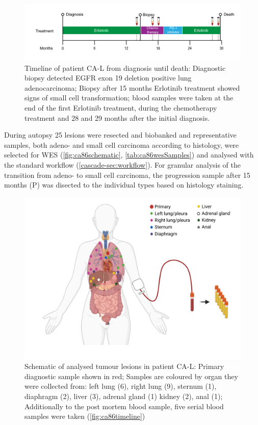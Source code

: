 \begin{figure}[ht]
\centering
\includegraphics[width=.99\linewidth]{Figures/CASCADE/CA86/CA-L_timeline}
\caption[Timeline of patient CA-L from diagnosis until death]{Timeline of patient CA-L from diagnosis until death: Diagnostic biopsy detected EGFR exon 19 deletion positive lung adenocarcinoma;  Biopsy after 15 months Erlotinib treatment showed signs of small cell transformation; blood samples were taken at the end of the first Erlotinib treatment, during the chemotherapy treatment and 28 and 29 months after the initial diagnosis.} \label{fig:ca86timeline}
\end{figure}

During autopsy 25 lesions were resected and biobanked and representative samples, both adeno- and small cell carcinoma according to histology, were selected for WES (\autoref{fig:ca86schematic}, \autoref{tab:ca86wesSamples}) and analysed with the standard workflow (\autoref{cascade-sec:workflow}). For granular analysis of the transition from adeno- to small cell carcinoma, the progression sample after 15 months (P) was disected to the individual types based on histology staining.


\begin{figure}[ht]
\centering
\includegraphics[width=.99\linewidth]{Figures/CASCADE/CA86/CA-L_schematic_CA86_organColours}
\caption[Schematic of analysed tumour lesions in patient CA-L]{Schematic of analysed tumour lesions in patient CA-L: Primary diagnostic sample shown in red; Samples are coloured by organ they were collected from: left lung (6), right lung (9), sternum (1), diaphragm (2), liver (3), adrenal gland (1) kidney (2), anal (1); Additionally to the post mortem blood sample, five serial blood samples were taken (\protect\autoref{fig:ca86timeline})} \label{fig:ca86schematic}
\end{figure}

